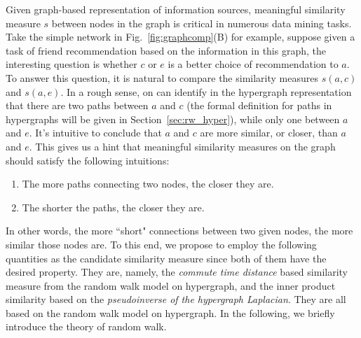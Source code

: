 
Given graph-based representation of information sources, meaningful similarity measure $s$ between nodes in the graph is critical in numerous data mining tasks. Take the simple network in Fig.~\ref{fig:graphcomp}(B) for example, suppose given a task of friend recommendation based on the information in this graph, the interesting question is whether $c$ or $e$ is a better choice of recommendation to $a$. To answer this question, it is natural to compare the similarity measures $s(a, c)$ and $s(a, e)$. In a rough sense, on can identify in the hypergraph representation that there are two paths between $a$ and $c$ (the formal definition for paths in hypergraphs will be given in Section~\ref{sec:rw_hyper}), while only one between $a$ and $e$. It's intuitive to conclude that $a$ and $c$ are more similar, or closer, than $a$ and $e$. This gives us a hint that meaningful similarity measures on the graph should satisfy the following intuitions:
\begin{enumerate}
\item The more paths connecting two nodes, the closer they are.
\item The shorter the paths, the closer they are.
\end{enumerate}
In other words, the more ``short" connections between two given nodes, the more similar those nodes are. To this end, we propose to employ the following quantities as the candidate similarity measure since both of them have the desired property. They are, namely, the \emph{commute time distance} based similarity measure from the random walk model on hypergraph, and the inner product similarity based on the \emph{pseudoinverse of the hypergraph Laplacian}. They are all based on the random walk model on hypergraph. In the following, we briefly introduce the theory of random walk.


